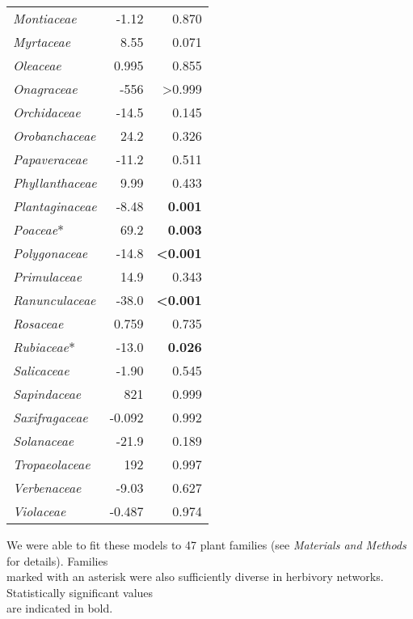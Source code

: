 \documentclass[12pt]{article}
\begin{document}
\begin{table}[!h]
\begin{tabular}{|l  rr|}
    \emph{Montiaceae} &  -1.12  & 0.870 \\
    \emph{Myrtaceae} &  8.55 & 0.071 \\
    \emph{Oleaceae} &  0.995 & 0.855 \\
    \emph{Onagraceae} &  -556  & \textgreater0.999 \\
    \emph{Orchidaceae} &  -14.5 & 0.145 \\
    \emph{Orobanchaceae} &  24.2  & 0.326 \\
    \emph{Papaveraceae} &  -11.2 & 0.511 \\
    \emph{Phyllanthaceae} &  9.99 & 0.433 \\
    \emph{Plantaginaceae} &  -8.48  & \textbf{0.001} \\
    \emph{Poaceae}* &  69.2  & \textbf{0.003} \\
    \emph{Polygonaceae} &  -14.8 & \textbf{\textless0.001} \\
    \emph{Primulaceae} &  14.9  & 0.343 \\
    \emph{Ranunculaceae} &  -38.0 & \textbf{\textless0.001} \\
    \emph{Rosaceae} &  0.759 & 0.735 \\
    \emph{Rubiaceae}* &  -13.0 & \textbf{0.026} \\
    \emph{Salicaceae} &  -1.90  & 0.545 \\
    \emph{Sapindaceae} &  821 & 0.999 \\
    \emph{Saxifragaceae} &  -0.092  & 0.992 \\
    \emph{Solanaceae} &  -21.9 & 0.189 \\
    \emph{Tropaeolaceae} &  192 & 0.997 \\
    \emph{Verbenaceae} &  -9.03  & 0.627 \\
    \emph{Violaceae} &  -0.487  & 0.974 \\
  \hline
  \end{tabular}
  \smallskip
  \footnotesize

    We were able to fit these models to 47 plant families (see \emph{Materials and Methods} for     details). 
    Families \\ marked with an asterisk were also sufficiently diverse in herbivory networks. 
    Statistically significant values \\ are indicated in bold. 

    \end{table}

\clearpage
\end{document}
